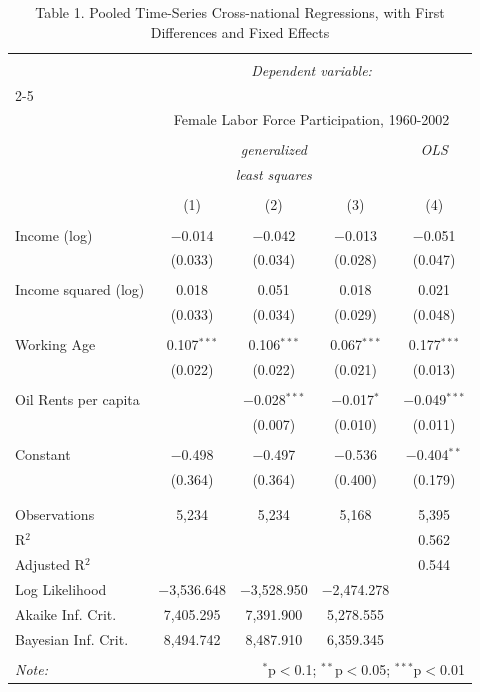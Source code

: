 \documentclass[12pt,letterpaper]{article}
\begin{document}
\begin{table}[!htbp] \centering 
	\caption*{Table 1. Pooled Time-Series Cross-national Regressions, with First Differences and Fixed Effects} 
	\label{} 
	\begin{tabular}{@{\extracolsep{5pt}}lcccc} 
		\\[-1.8ex]\hline 
		\hline \\[-1.8ex] 
		& \multicolumn{4}{c}{\textit{Dependent variable:}} \\ 
		\cline{2-5} 
		\\[-1.8ex] & \multicolumn{4}{c}{Female Labor Force Participation, 1960-2002} \\ 
		\\[-1.8ex] & \multicolumn{3}{c}{\textit{generalized}} & \textit{OLS} \\ 
		& \multicolumn{3}{c}{\textit{least squares}} & \textit{} \\ 
		\\[-1.8ex] & (1) & (2) & (3) & (4)\\ 
		\hline \\[-1.8ex] 
		Income (log) & $-$0.014 & $-$0.042 & $-$0.013 & $-$0.051 \\ 
		& (0.033) & (0.034) & (0.028) & (0.047) \\ 
		& & & & \\ 
		Income squared (log) & 0.018 & 0.051 & 0.018 & 0.021 \\ 
		& (0.033) & (0.034) & (0.029) & (0.048) \\ 
		& & & & \\ 
		Working Age & 0.107$^{***}$ & 0.106$^{***}$ & 0.067$^{***}$ & 0.177$^{***}$ \\ 
		& (0.022) & (0.022) & (0.021) & (0.013) \\ 
		& & & & \\ 
		Oil Rents per capita &  & $-$0.028$^{***}$ & $-$0.017$^{*}$ & $-$0.049$^{***}$ \\ 
		&  & (0.007) & (0.010) & (0.011) \\ 
		& & & & \\ 
		Constant & $-$0.498 & $-$0.497 & $-$0.536 & $-$0.404$^{**}$ \\ 
		& (0.364) & (0.364) & (0.400) & (0.179) \\ 
		& & & & \\ 
		\hline \\[-1.8ex] 
		Observations & 5,234 & 5,234 & 5,168 & 5,395 \\ 
		R$^{2}$ &  &  &  & 0.562 \\ 
		Adjusted R$^{2}$ &  &  &  & 0.544 \\ 
		Log Likelihood & $-$3,536.648 & $-$3,528.950 & $-$2,474.278 &  \\ 
		Akaike Inf. Crit. & 7,405.295 & 7,391.900 & 5,278.555 &  \\ 
		Bayesian Inf. Crit. & 8,494.742 & 8,487.910 & 6,359.345 &  \\ 
		\hline 
		\hline \\[-1.8ex] 
		\textit{Note:}  & \multicolumn{4}{r}{$^{*}$p$<$0.1; $^{**}$p$<$0.05; $^{***}$p$<$0.01} \\ 
	\end{tabular} 
\end{table} 
\end{document}
